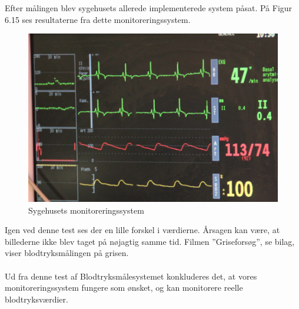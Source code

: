 Efter målingen blev sygehusets allerede implementerede system påsat. På Figur 6.15 ses resultaterne fra dette monitoreringssystem. 

\begin{figure}[H]
	\centering
	\includegraphics[width=1\textwidth]{Figurer/Snip20151214_102}
	\caption{Sygehusets monitoreringssystem}
\end{figure}


Igen ved denne test ses der en lille forskel i værdierne. Årsagen kan være, at billederne ikke blev taget på nøjagtig samme tid. Filmen ”Griseforsøg”, se bilag, viser blodtryksmålingen på grisen.
\\\\ 
Ud fra denne test af Blodtryksmålesystemet konkluderes det, at vores monitoreringssystem fungere som ønsket, og kan monitorere reelle blodtryksværdier. 


